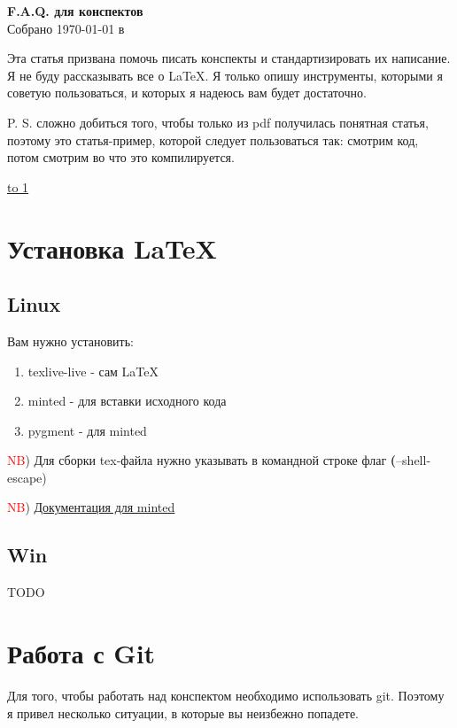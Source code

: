 \documentclass[12pt]{article}
\begin{document}
    \begin{center}

    {\Large \bf F.A.Q. для конспектов} \\
    \vspace{0.5em}
    {\large Собрано {\today} в {\currenttime}}

    Эта статья призвана помочь писать конспекты и стандартизировать их написание. Я не буду рассказывать все о LaTeX. Я только опишу инструменты, которыми я советую пользоваться, и которых я надеюсь вам будет достаточно.


    P. S. сложно добиться того, чтобы только из pdf получилась понятная статья, поэтому это статья-пример, которой следует пользоваться так: смотрим код, потом смотрим во что это компилируется.

    \end{center}
\underline{\hbox to 1\textwidth{{ } \hfil{ } \hfil{ } }}

\tableofcontents

\newpage

\section{Установка LaTeX}

\subsection{Linux}

Вам нужно установить:
\begin{enumerate}
    \item texlive-live - сам LaTeX
    \item minted - для вставки исходного кода
    \item pygment - для minted
\end{enumerate}


\textcolor{red}{NB}) Для сборки tex-файла нужно указывать в командной строке флаг \textbf(--shell-escape)


\textcolor{red}{NB}) \href{http://tug.ctan.org/macros/latex/contrib/minted/minted.pdf}{Документация для minted}

\subsection{Win}
    TODO
\section{Работа с Git}
Для того, чтобы работать над конспектом необходимо использовать git. Поэтому я привел несколько ситуации, в которые вы неизбежно попадете.
\end{document}
